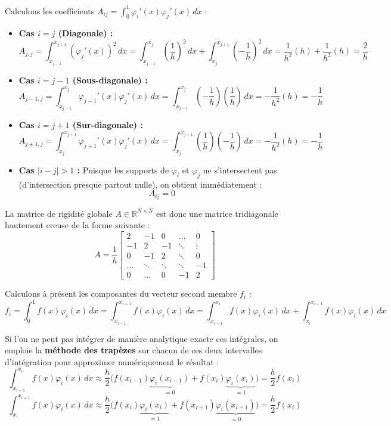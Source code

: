 Calculons les coefficients $A_{ij} = \int_{0}^{1} \varphi_i'(x) \varphi_j'(x) \, dx$ :
\begin{itemize}
    \item \textbf{Cas $i = j$ (Diagonale) :}
    $$A_{j,j} = \int_{x_{j-1}}^{x_{j+1}} (\varphi_j'(x))^2 \, dx = \int_{x_{j-1}}^{x_j} \left(\frac{1}{h}\right)^2 \, dx + \int_{x_j}^{x_{j+1}} \left(-\frac{1}{h}\right)^2 \, dx = \frac{1}{h^2}(h) + \frac{1}{h^2}(h) = \frac{2}{h}$$
    
    \item \textbf{Cas $i = j-1$ (Sous-diagonale) :}
    $$A_{j-1,j} = \int_{x_{j-1}}^{x_j} \varphi_{j-1}'(x) \varphi_j'(x) \, dx = \int_{x_{j-1}}^{x_j} \left(-\frac{1}{h}\right)\left(\frac{1}{h}\right) \, dx = -\frac{1}{h^2}(h) = -\frac{1}{h}$$
    
    \item \textbf{Cas $i = j+1$ (Sur-diagonale) :}
    $$A_{j+1, j} = \int_{x_j}^{x_{j+1}} \varphi_{j+1}'(x) \varphi_j'(x) \, dx = \int_{x_j}^{x_{j+1}} \left(\frac{1}{h}\right)\left(-\frac{1}{h}\right) \, dx = -\frac{1}{h^2}(h) = -\frac{1}{h}$$
    
    \item \textbf{Cas $|i-j| > 1$ :}
    Puisque les supports de $\varphi_i$ et $\varphi_j$ ne s'intersectent pas (d'intersection presque partout nulle), on obtient immédiatement :
    $$A_{ij} = 0$$
\end{itemize}

La matrice de rigidité globale $A \in \mathbb{R}^{N \times N}$ est donc une matrice tridiagonale hautement creuse de la forme suivante :
\begin{equation}
A = \frac{1}{h} \begin{bmatrix}
2 & -1 & 0 & \dots & 0 \\
-1 & 2 & -1 & \ddots & \vdots \\
0 & -1 & 2 & \ddots & 0 \\
\dots & \ddots & \ddots & \ddots & -1 \\
0 & \dots & 0 & -1 & 2
\end{bmatrix}
\end{equation}

Calculons à présent les composantes du vecteur second membre $f_i$ :
$$f_i = \int_{0}^{1} f(x) \varphi_i(x) \, dx = \int_{x_{i-1}}^{x_{i+1}} f(x)\varphi_i(x) \, dx = \int_{x_{i-1}}^{x_i} f(x) \varphi_i(x) \, dx + \int_{x_i}^{x_{i+1}} f(x) \varphi_i(x) \, dx$$

Si l'on ne peut pas intégrer de manière analytique exacte ces intégrales, on emploie la \textbf{méthode des trapèzes} sur chacun de ces deux intervalles d'intégration pour approximer numériquement le résultat :
$$\int_{x_{i-1}}^{x_i} f(x)\varphi_i(x) \, dx \approx \frac{h}{2} \Big( f(x_{i-1})\underbrace{\varphi_i(x_{i-1})}_{=0} + f(x_i)\underbrace{\varphi_i(x_i)}_{=1} \Big) = \frac{h}{2} f(x_i)$$
$$\int_{x_i}^{x_{i+1}} f(x)\varphi_i(x) \, dx \approx \frac{h}{2} \Big( f(x_i)\underbrace{\varphi_i(x_i)}_{=1} + f(x_{i+1})\underbrace{\varphi_i(x_{i+1})}_{=0} \Big) = \frac{h}{2} f(x_i)$$

